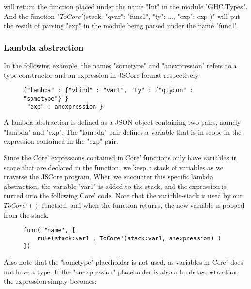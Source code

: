 will return the function placed under the name "Int" in the module "GHC.Types". And 
the function "$ToCore'$(stack, {"qvar": "func1", "ty": ..., "exp": exp } )" will
put the result of parsing "exp" in the module being parsed under the name "func1".

\subsubsection*{Lambda abstraction}

In the following example, the names "sometype" and "anexpression" refers to a 
type constructor and an expression in JSCore format respectively.

\begin{figure}[H]
\lstset{ %
language=Haskell,
caption=Python class implementing the Haskell Int Value.,
label=lst:int1
}
\begin{lstlisting}
{"lambda" : {"vbind" : "var1", "ty" : {"qtycon" : "sometype"} }
 "exp" : anexpression }
\end{lstlisting}
\end{figure}

A lambda abstraction is defined as a JSON object containing two pairs, namely 
"lambda" and "exp". The "lambda" pair defines a variable that is in scope in the
expression contained in the "exp" pair.

Since the Core' expressions contained in Core' functions only have variables in 
scope that are declared in the function, we keep a stack of variables as we traverse
the JSCore program. When we encounter this specific lambda abstraction, the variable
"var1" is added to the stack, and the expression is turned into the following Core' code. 
Note that the variable-stack is used by our $ToCore'()$ function, and when
the function returns, the new variable is popped from the stack.

\begin{figure}[H]
\lstset{ %
language=Haskell,
caption=Lambda abstraction in Core' format,
label=lst:int1
}
\begin{lstlisting}
func( "name", [
    rule(stack:var1 , ToCore'(stack:var1, anexpression) )
])
\end{lstlisting}
\end{figure}

Also note that the "sometype" placeholder is not used, as variables in Core' does
not have a type. If the "anexpression" placeholder is also a lambda-abstraction, the
expression simply becomes:

